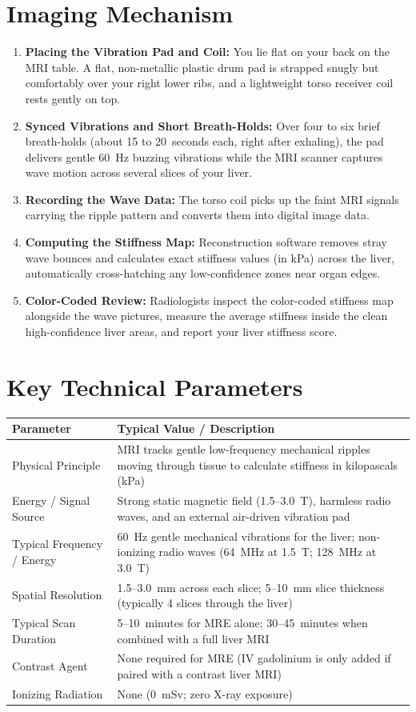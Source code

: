 \section{Imaging Mechanism}
\begin{enumerate}
\item \textbf{Placing the Vibration Pad and Coil:} You lie flat on your back on the MRI table. A flat, non-metallic plastic drum pad is strapped snugly but comfortably over your right lower ribs, and a lightweight torso receiver coil rests gently on top.
\item \textbf{Synced Vibrations and Short Breath-Holds:} Over four to six brief breath-holds (about 15 to 20~seconds each, right after exhaling), the pad delivers gentle 60~Hz buzzing vibrations while the MRI scanner captures wave motion across several slices of your liver.
\item \textbf{Recording the Wave Data:} The torso coil picks up the faint MRI signals carrying the ripple pattern and converts them into digital image data.
\item \textbf{Computing the Stiffness Map:} Reconstruction software removes stray wave bounces and calculates exact stiffness values (in kPa) across the liver, automatically cross-hatching any low-confidence zones near organ edges.
\item \textbf{Color-Coded Review:} Radiologists inspect the color-coded stiffness map alongside the wave pictures, measure the average stiffness inside the clean high-confidence liver areas, and report your liver stiffness score.
\end{enumerate}

\section{Key Technical Parameters}
\noindent
\begin{tabularx}{\textwidth}{@{}l X@{}}
\toprule
\textbf{Parameter} & \textbf{Typical Value / Description} \\
\midrule
Physical Principle & MRI tracks gentle low-frequency mechanical ripples moving through tissue to calculate stiffness in kilopascals (kPa) \\
Energy / Signal Source & Strong static magnetic field (1.5--3.0~T), harmless radio waves, and an external air-driven vibration pad \\
Typical Frequency / Energy & 60~Hz gentle mechanical vibrations for the liver; non-ionizing radio waves (64~MHz at 1.5~T; 128~MHz at 3.0~T) \\
Spatial Resolution & 1.5--3.0~mm across each slice; 5--10~mm slice thickness (typically 4 slices through the liver) \\
Typical Scan Duration & 5--10~minutes for MRE alone; 30--45~minutes when combined with a full liver MRI \\
Contrast Agent & None required for MRE (IV gadolinium is only added if paired with a contrast liver MRI) \\
Ionizing Radiation & None (0~mSv; zero X-ray exposure) \\
\bottomrule
\end{tabularx}

